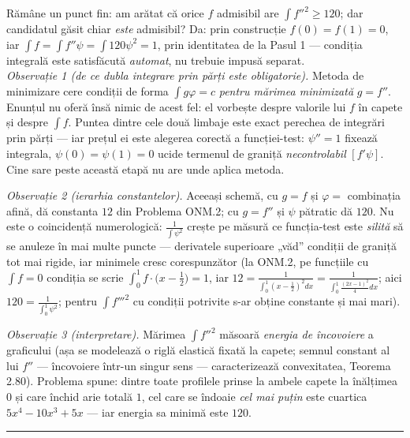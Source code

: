 Rămâne un punct fin: am arătat că orice $f$ admisibil are $\int f''^{2}\ge120$; dar candidatul găsit chiar \emph{este} admisibil? Da: prin construcție $f(0)=f(1)=0$, iar $\int f=\int f''\psi=\int120\psi^{2}=1$, prin identitatea de la Pasul 1 --- condiția integrală este satisfăcută \emph{automat}, nu trebuie impusă separat.\\[2pt]
\emph{Observație 1 (de ce dubla integrare prin părți este obligatorie).} Metoda de minimizare cere condiții de forma $\int g\varphi=c$ \emph{pentru mărimea minimizată} $g=f''$. Enunțul nu oferă însă nimic de acest fel: el vorbește despre valorile lui $f$ în capete și despre $\int f$. Puntea dintre cele două limbaje este exact perechea de integrări prin părți --- iar prețul ei este alegerea corectă a funcției-test: $\psi''=1$ fixează integrala, $\psi(0)=\psi(1)=0$ ucide termenul de graniță \emph{necontrolabil} $[f'\psi]$. Cine sare peste această etapă nu are unde aplica metoda.

\emph{Observație 2 (ierarhia constantelor).} Aceeași schemă, cu $g=f$ și $\varphi=$ combinația afină, dă constanta $12$ din Problema ONM.2; cu $g=f''$ și $\psi$ pătratic dă $120$. Nu este o coincidență numerologică: $\frac{1}{\int\psi^{2}}$ crește pe măsură ce funcția-test este \emph{silită} să se anuleze în mai multe puncte --- derivatele superioare „văd'' condiții de graniță tot mai rigide, iar minimele cresc corespunzător (la ONM.2, pe funcțiile cu $\int f=0$ condiția se scrie $\int_0^1 f\cdot\bigl(x-\frac12\bigr)=1$, iar $12=\frac{1}{\int_0^1(x-\frac12)^2dx}=\frac{1}{\int_0^1\frac{(2x-1)^2}{4}dx}$; aici $120=\frac{1}{\int_0^1\psi^2}$; pentru $\int f'''^{2}$ cu condiții potrivite s-ar obține constante și mai mari).

\emph{Observație 3 (interpretare).} Mărimea $\int f''^{2}$ măsoară \emph{energia de încovoiere} a graficului (așa se modelează o riglă elastică fixată la capete; semnul constant al lui $f''$ --- încovoiere într-un singur sens --- caracterizează convexitatea, Teorema 2.80). Problema spune: dintre toate profilele prinse la ambele capete la înălțimea $0$ și care închid arie totală $1$, cel care se îndoaie \emph{cel mai puțin} este cuartica $5x^{4}-10x^{3}+5x$ --- iar energia sa minimă este $120$.
\vspace{1mm}\hrule

